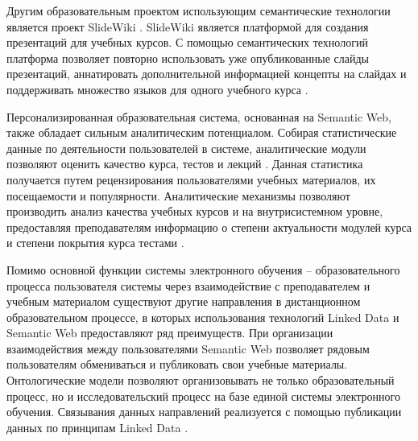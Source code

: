 Другим образовательным проектом использующим семантические технологии является проект SlideWiki \cite{khalili2012slidewiki}. SlideWiki является платформой для создания презентаций для учебных курсов. С помощью семантических технологий платформа позволяет повторно использовать уже опубликованные слайды презентаций, аннатировать дополнительной информацией концепты на слайдах и поддерживать множество языков для одного учебного курса \cite{tarasowa2014crowd}.

Персонализированная образовательная система, основанная на Semantic Web, также обладает сильным аналитическим потенциалом.  Собирая статистические данные по деятельности пользователей в системе, аналитические модули позволяют оценить качество курса, тестов и лекций \cite{aroyo2004new}. Данная статистика получается путем рецензирования пользователями учебных материалов, их посещаемости и популярности. Аналитические механизмы позволяют производить анализ качества учебных курсов и на внутрисистемном уровне, предоставляя преподавателям информацию о степени актуальности модулей курса и степени покрытия курса тестами \cite{puustjarvi2004integrating}.



Помимо основной функции системы электронного обучения – образовательного процесса  пользователя системы через взаимодействие с преподавателем и учебным материалом существуют другие направления в дистанционном образовательном процессе, в которых использования технологий Linked Data и Semantic Web предоставляют ряд преимуществ. При организации взаимодействия между пользователями Semantic Web позволяет рядовым пользователям обмениваться и публиковать свои учебные материалы. Онтологические модели позволяют организовывать не только образовательный процесс, но и исследовательский процесс на базе единой системы электронного обучения. Связывания данных направлений реализуется с помощью публикации данных по принципам Linked Data \cite{white2013conceptual}. 


